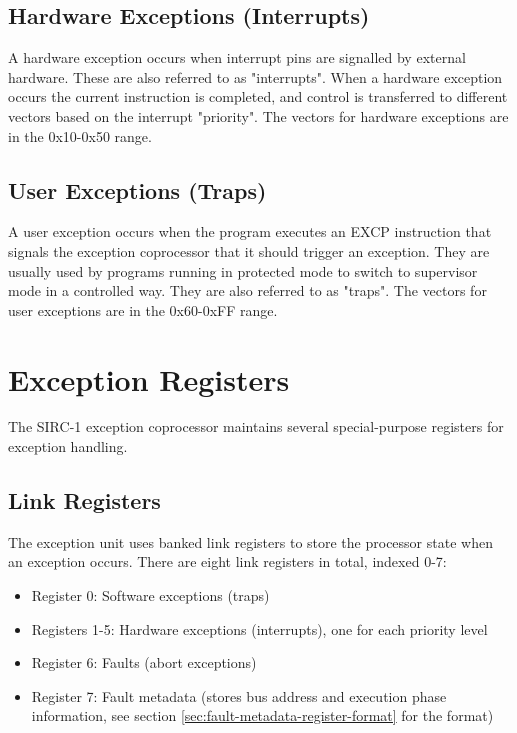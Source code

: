 \subsection{Hardware Exceptions (Interrupts)}

A hardware exception occurs when interrupt pins are signalled by external hardware. These are also referred to as
"interrupts". When a hardware exception occurs the current instruction is completed, and control is transferred to
different vectors based on the interrupt "priority". The vectors for hardware exceptions are in the 0x10-0x50 range.

\subsection{User Exceptions (Traps)}

A user exception occurs when the program executes an EXCP instruction that signals the exception coprocessor that it
should trigger an exception. They are usually used by programs running in protected mode to switch to supervisor mode
in a controlled way. They are also referred to as "traps". The vectors for user exceptions are in the 0x60-0xFF range.

\section{Exception Registers}

The SIRC-1 exception coprocessor maintains several special-purpose registers for exception handling.

\subsection{Link Registers}

The exception unit uses banked link registers to store the processor state when an exception occurs. There are eight
link registers in total, indexed 0-7:

\begin{itemize}
	\item Register 0: Software exceptions (traps)
	\item Registers 1-5: Hardware exceptions (interrupts), one for each priority level
	\item Register 6: Faults (abort exceptions)
	\item Register 7: Fault metadata (stores bus address and execution phase information, see section
	      \ref{sec:fault-metadata-register-format} for the format)
\end{itemize}

